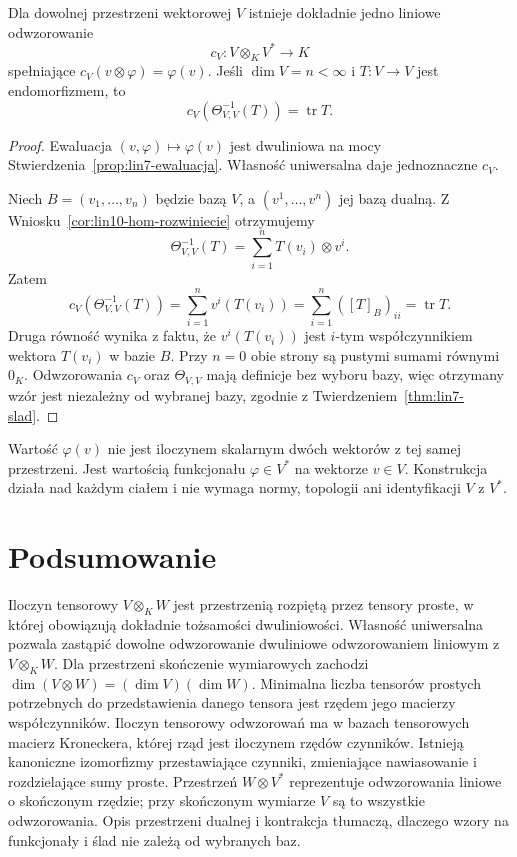 \begin{twierdzenie}
\label{thm:lin10-kontrakcja}
Dla dowolnej przestrzeni
wektorowej \(V\) istnieje
dokładnie jedno liniowe
odwzorowanie
\[
 c_V\colon V\otimes_KV^*\to K
\]
spełniające
\(c_V(v\otimes\varphi)=\varphi(v)\).
Jeśli \(\dim V=n<\infty\)
i \(T\colon V\to V\)
jest endomorfizmem, to
\[
 c_V(\Theta_{V,V}^{-1}(T))
 =\operatorname{tr}T.
\]
\end{twierdzenie}
\begin{proof}
Ewaluacja
\((v,\varphi)\mapsto\varphi(v)\)
jest dwuliniowa na mocy
Stwierdzenia~\ref{prop:lin7-ewaluacja}.
Własność uniwersalna
daje jednoznaczne \(c_V\).

Niech \(B=(v_1,\ldots,v_n)\)
będzie bazą \(V\),
a \((v^1,\ldots,v^n)\)
jej bazą dualną.
Z
Wniosku~\ref{cor:lin10-hom-rozwiniecie}
otrzymujemy
\[
 \Theta_{V,V}^{-1}(T)
 =\sum_{i=1}^n T(v_i)\otimes v^i.
\]
Zatem
\[
 c_V(\Theta_{V,V}^{-1}(T))
 =\sum_{i=1}^n v^i(T(v_i))
 =\sum_{i=1}^n ([T]_B)_{ii}
 =\operatorname{tr}T.
\]
Druga równość wynika z faktu,
że \(v^i(T(v_i))\) jest
\(i\)-tym współczynnikiem
wektora \(T(v_i)\) w bazie \(B\).
Przy \(n=0\) obie strony
są pustymi sumami równymi \(0_K\).
Odwzorowania \(c_V\) oraz
\(\Theta_{V,V}\) mają definicje
bez wyboru bazy, więc
otrzymany wzór jest niezależny
od wybranej bazy, zgodnie
z
Twierdzeniem~\ref{thm:lin7-slad}.
\end{proof}

\begin{uwaga}
\label{rem:lin10-ewaluacja}
Wartość \(\varphi(v)\)
nie jest iloczynem skalarnym
dwóch wektorów z tej samej
przestrzeni. Jest wartością
funkcjonału \(\varphi\in V^*\)
na wektorze \(v\in V\).
Konstrukcja działa nad każdym
ciałem i nie wymaga normy,
topologii ani identyfikacji
\(V\) z \(V^*\).
\end{uwaga}

\section{Podsumowanie}
\label{sec:lin10-podsumowanie}

Iloczyn tensorowy \(V\otimes_KW\)
jest przestrzenią rozpiętą
przez tensory proste, w której
obowiązują dokładnie tożsamości
dwuliniowości.
Własność uniwersalna pozwala
zastąpić dowolne odwzorowanie
dwuliniowe odwzorowaniem liniowym
z \(V\otimes_KW\).
Dla przestrzeni skończenie
wymiarowych zachodzi
\(\dim(V\otimes W)
 =(\dim V)(\dim W)\).
Minimalna liczba tensorów prostych
potrzebnych do przedstawienia
danego tensora jest rzędem
jego macierzy współczynników.
Iloczyn tensorowy odwzorowań
ma w bazach tensorowych macierz
Kroneckera, której rząd jest
iloczynem rzędów czynników.
Istnieją kanoniczne izomorfizmy
przestawiające czynniki,
zmieniające nawiasowanie
i rozdzielające sumy proste.
Przestrzeń \(W\otimes V^*\)
reprezentuje odwzorowania
liniowe o skończonym rzędzie;
przy skończonym wymiarze \(V\)
są to wszystkie odwzorowania.
Opis przestrzeni dualnej i kontrakcja
tłumaczą, dlaczego wzory
na funkcjonały i ślad
nie zależą od wybranych baz.
